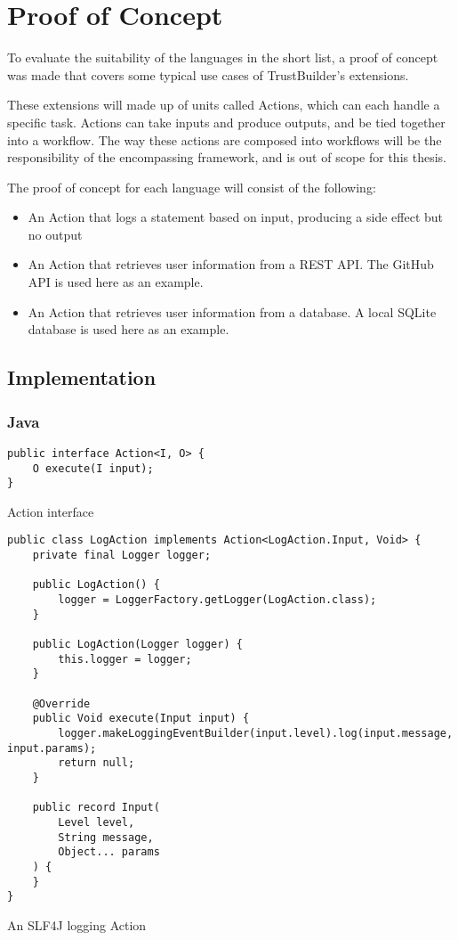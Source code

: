 \chapter{Proof of Concept}
\label{ch:proof-of-concept}
To evaluate the suitability of the languages in the short list, a proof of concept was made that covers some typical use cases of TrustBuilder's extensions. 

These extensions will made up of units called Actions, which can each handle a specific task. Actions can take inputs and produce outputs, and be tied together into a workflow. The way these actions are composed into workflows will be the responsibility of the encompassing framework, and is out of scope for this thesis.

The proof of concept for each language will consist of the following:
\begin{itemize}
    \item An Action that logs a statement based on input, producing a side effect but no output
    \item An Action that retrieves user information from a REST API. The GitHub API is used here as an example.
    \item An Action that retrieves user information from a database. A local SQLite database is used here as an example.
\end{itemize}

\section{Implementation}
\subsection{Java}

\begin{listing}[H]
\begin{verbatim}
public interface Action<I, O> {
    O execute(I input);
}
\end{verbatim}
\caption{Action interface}
\end{listing}

\begin{listing}[H]
\begin{verbatim}
public class LogAction implements Action<LogAction.Input, Void> {
    private final Logger logger;
    
    public LogAction() {
        logger = LoggerFactory.getLogger(LogAction.class);
    }
    
    public LogAction(Logger logger) {
        this.logger = logger;
    }
    
    @Override
    public Void execute(Input input) {
        logger.makeLoggingEventBuilder(input.level).log(input.message, input.params);
        return null;
    }
    
    public record Input(
        Level level,
        String message,
        Object... params
    ) {
    }
}
\end{verbatim}
\caption{An SLF4J logging Action}
\end{listing}


